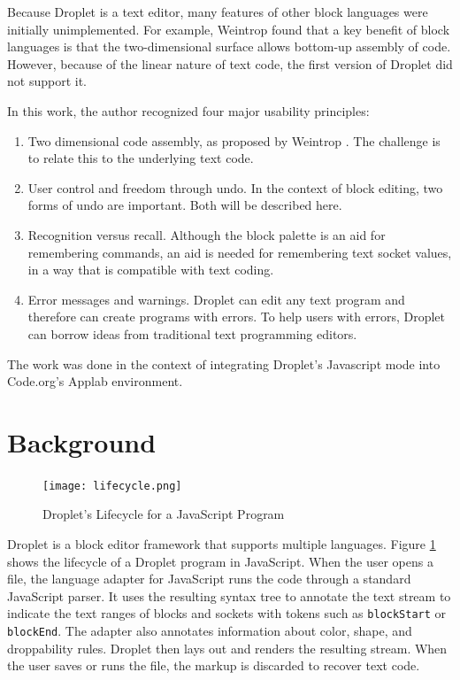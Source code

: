 \documentclass[conference]{IEEEtran}
\begin{document}
Because Droplet is a text editor, many features of other block languages were initially unimplemented. For example, Weintrop \cite{Weintrop} found that a key benefit of block languages is that the two-dimensional surface allows bottom-up assembly of code. However, because of the linear nature of text code, the first version of Droplet did not support it.

In this work, the author recognized four major usability principles:

\begin{enumerate}
  \item Two dimensional code assembly, as proposed by Weintrop \cite{Weintrop}. The challenge is to relate this to the underlying text code.
  \item User control and freedom through undo. In the context of block editing, two forms of undo are important. Both will be described here.
  \item Recognition versus recall.  Although the block palette is an aid for remembering commands, an aid is needed for remembering text socket values, in a way that is compatible with text coding.
  \item Error messages and warnings. Droplet can edit any text program and therefore can create programs with errors. To help users with errors, Droplet can borrow ideas from traditional text programming editors.
\end{enumerate}

The work was done in the context of integrating Droplet's Javascript mode into Code.org's Applab environment.

\section{Background}
\begin{figure}
\centering
\texttt{[image: lifecycle.png]}
\caption{Droplet's Lifecycle for a JavaScript Program}
\label{lifecycle}
\end{figure}

Droplet is a block editor framework that supports multiple languages. Figure \ref{lifecycle} shows the lifecycle of a Droplet program in JavaScript. When the user opens a file, the language adapter for JavaScript runs the code through a standard JavaScript parser. It uses the resulting syntax tree to annotate the text stream to indicate the text ranges of blocks and sockets with tokens such as \texttt{blockStart} or \texttt{blockEnd}. The adapter also annotates information about color, shape, and droppability rules. Droplet then lays out and renders the resulting stream. When the user saves or runs the file, the markup is discarded to recover text code.
\end{document}
